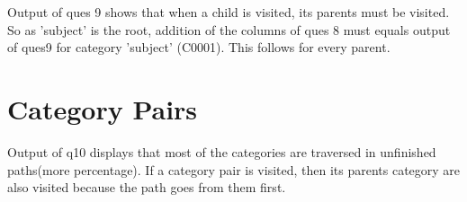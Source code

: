 \documentclass[12pt]{article}
\begin{document}
Output of ques 9 shows that when a child is visited, its parents must be visited. So as 'subject' is the root, addition of the columns of ques 8 must equals output of ques9 for category 'subject' (C0001). This follows for every parent.


\section{Category Pairs}
Output of q10 displays that most of the categories are traversed in unfinished paths(more percentage).
If a category pair is visited, then its parents category are also visited because the path goes from them first.
\end{document}

